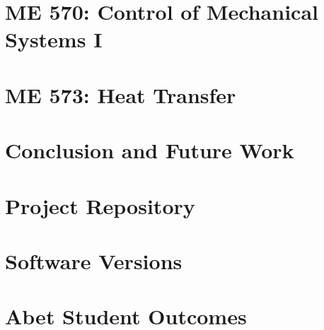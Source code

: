 \documentclass[12pt]{report}
\begin{document}
    \chapter{ME 570: Control of Mechanical Systems I}
    

    \chapter{ME 573: Heat Transfer}
    
    
    \chapter{Conclusion and Future Work}
    

    \appendix
    \chapter{Project Repository}
    \label{appendix:appendix_github}
    

    \chapter{Software Versions}
    \label{appendix:appendix_versions}
    

    \chapter{Abet Student Outcomes}
    \label{appendix:appendix_abet}
    


    
\end{document}
